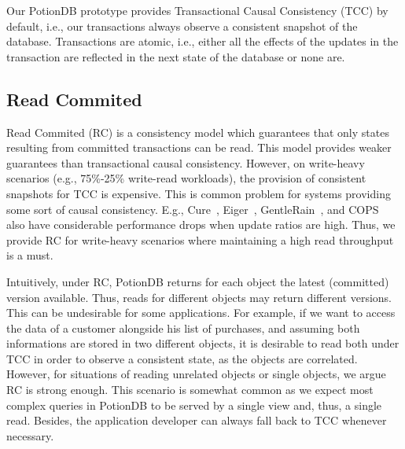 \documentclass{vldb}
\begin{document}
Our PotionDB prototype provides Transactional Causal Consistency (TCC) by default, i.e., our transactions always observe a consistent snapshot of the database.
Transactions are atomic, i.e., either all the effects of the updates in the transaction are reflected in the next state of the database or none are.

\subsection{Read Commited}
\label{subsec:readcommited}
Read Commited (RC) is a consistency model which guarantees that only states resulting from committed transactions can be read.
This model provides weaker guarantees than transactional causal consistency.
However, on write-heavy scenarios (e.g., 75\%-25\% write-read workloads), the provision of consistent snapshots for TCC is expensive.
This is common problem for systems providing some sort of causal consistency.
E.g., Cure~\cite{cure}, Eiger~\cite{eiger}, GentleRain~\cite{gentlerain}, and COPS~\cite{cops} also have considerable performance drops when update ratios are high.
Thus, we provide RC for write-heavy scenarios where maintaining a high read throughput is a must.

Intuitively, under RC, PotionDB returns for each object the latest (committed) version available.
Thus, reads for different objects may return different versions.
This can be undesirable for some applications.
For example, if we want to access the data of a customer alongside his list of purchases, and assuming both informations are stored in two different objects, it is desirable to read both under TCC in order to observe a consistent state, as the objects are correlated.
However, for situations of reading unrelated objects or single objects, we argue RC is strong enough.
This scenario is somewhat common as we expect most complex queries in PotionDB to be served by a single view and, thus, a single read.
Besides, the application developer can always fall back to TCC whenever necessary.
\end{document}
